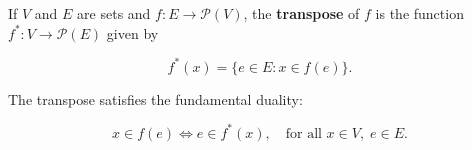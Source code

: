 If $V$ and $E$ are sets and $f: E \to \mathcal{P}(V)$, the \textbf{transpose} of $f$ is the function $f^*: V \to \mathcal{P}(E)$ given by

$$f^*(x) = \{e \in E : x \in f(e)\}.$$

The transpose satisfies the fundamental duality:

$$x \in f(e) \iff e \in f^*(x), \quad \text{for all } x \in V,\; e \in E.$$
